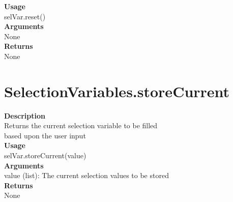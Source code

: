\documentclass[11pt, oneside]{article}
\begin{document}
\noindent\textbf{Usage} \\
        selVar.reset() \\

\noindent\textbf{Arguments} \\
        None\\

\noindent\textbf{Returns} \\
        None\\


\section{SelectionVariables.storeCurrent}

\textbf{Description} \\
        Returns the current selection variable to be filled \\
        based upon the user input\\

\noindent\textbf{Usage} \\
        selVar.storeCurrent(value) \\

\noindent\textbf{Arguments} \\
        value (list): The current selection values to be stored\\

\noindent\textbf{Returns} \\
        None\\

           
\end{document}
